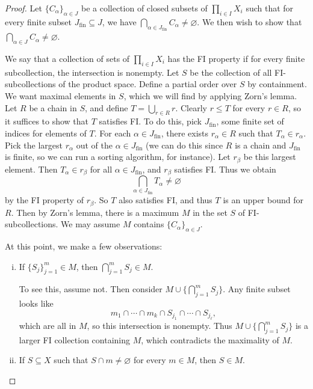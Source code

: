 \begin{proof}
  Let $\{C_\alpha\}_{\alpha \in J}$ be a collection
  of closed subsets of $\prod_{i \in I} X_i$
  such that for every finite subset
  $J_\text{fin} \subseteq J$, we have
  $\bigcap_{\alpha \in J_\text{fin}} C_\alpha \ne \varnothing$.
  We then wish to show that $\bigcap_{\alpha \in J} C_\alpha \ne \varnothing$.

  We say that a collection of sets of
  $\prod_{i \in I} X_i$ has the FI property if
  for every finite subcollection, the intersection is
  nonempty. Let $S$ be the collection of all
  FI-subcollections of the product space. Define
  a partial order over $S$ by containment. We want
  maximal elements in $S$, which we will find by
  applying Zorn's lemma. Let $R$ be a chain in $S$,
  and define $T = \bigcup_{r \in R} r$. Clearly
  $r \le T$ for every $r \in R$, so it suffices
  to show that $T$ satisfies FI. To do this, pick
  $J_\text{fin}$, some finite set of indices for
  elements of $T$. For each $\alpha \in J_\text{fin}$,
  there exists $r_\alpha \in R$ such that
  $T_\alpha \in r_\alpha$. Pick the largest
  $r_\alpha$ out of the $\alpha \in J_\text{fin}$
  (we can do this since $R$ is a chain and
  $J_\text{fin}$ is finite, so we can run a sorting
  algorithm, for instance). Let $r_\beta$ be this
  largest element. Then $T_\alpha \in r_\beta$ for all
  $\alpha \in J_\text{fin}$, and $r_\beta$ satisfies
  FI. Thus we obtain
  \[
    \bigcap_{\alpha \in J_\text{fin}} T_\alpha
    \ne \varnothing
  \]
  by the FI property of $r_\beta$. So $T$ also
  satisfies FI, and thus $T$ is an upper bound
  for $R$. Then by Zorn's lemma, there is
  a maximum $M$ in the set $S$ of
  FI-subcollections. We may assume
  $M$ contains $\{C_\alpha\}_{\alpha \in J}$.

  At this point, we make a few observations:
  \begin{enumerate}[(i)]
    \item If $\{S_j\}_{j = 1}^m \in M$, then
      $\bigcap_{j = 1}^m S_j \in M$.

      To see this, assume not. Then consider
      $M \cup \{\bigcap_{j = 1}^m S_j\}$.
      Any finite subset looks like
      \[
        m_1 \cap \cdots \cap m_k \cap S_{j_1} \cap \cdots \cap S_{j_\ell},
      \]
      which are all in $M$, so this intersection
      is nonempty. Thus $M \cup \{\bigcap_{j = 1}^m S_j\}$
      is a larger FI collection containing $M$,
      which contradicts the maximality of $M$.
    \item If $S \subseteq X$ such that
      $S \cap m \ne \varnothing$ for every $m \in M$,
      then $S \in M$.


\end{enumerate}
\end{proof}
